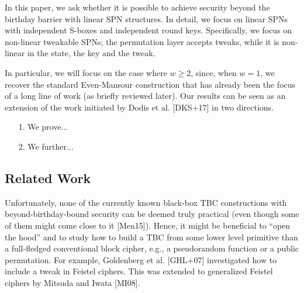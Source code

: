 In this paper, we ask whether it is possible to achieve security beyond the birthday barrier with linear SPN structures. In detail, we focus on linear SPNs with independent S-boxes and independent round keys. Specifically, we focus on non-linear tweakable SPNs; the permutation layer
accepts tweaks, while it is non-linear in the state, the key and the tweak.

In particular, we will focus on the case where $w\geq2$, since, when $w = 1$, we
recover the standard Even-Mansour construction that has already been the focus
of a long line of work (as briefly reviewed later). Our results can be seen as an
extension of the work initiated by Dodis et al. [DKS+17] in two directions.
\begin{enumerate}
	\item[1.] We prove...
	\item[2.] We further...
\end{enumerate}



\medskip{}



\medskip{}








\subsection{Related Work}


Unfortunately, none of the currently known black-box
TBC constructions with beyond-birthday-bound security can be deemed truly practical (even
though some of them might come close to it [Men15]). Hence, it might be beneficial to “open
the hood” and to study how to build a TBC from some lower level primitive than a full-fledged
conventional block cipher, e.g., a pseudorandom function or a public permutation. For example,
Goldenberg et al. [GHL+07] investigated how to include a tweak in Feistel ciphers. This was
extended to generalized Feistel ciphers by Mitsuda and Iwata [MI08].




